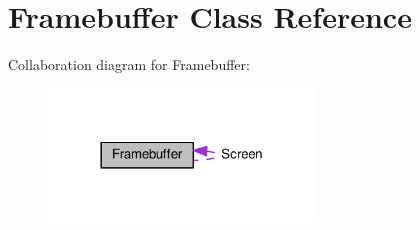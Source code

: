 \hypertarget{class_framebuffer}{}\section{Framebuffer Class Reference}
\label{class_framebuffer}


Collaboration diagram for Framebuffer\+:\nopagebreak
\begin{figure}[H]
\begin{center}
\leavevmode
\includegraphics[width=201pt]{class_framebuffer__coll__graph}
\end{center}
\end{figure}
